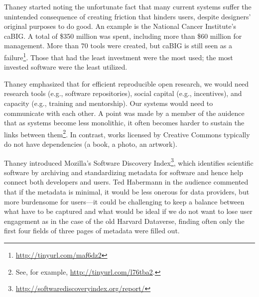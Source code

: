 \documentclass[11pt, oneside]{amsart}
\begin{document}
Thaney started noting the unfortunate fact that many current systems suffer the
unintended consequence of creating friction that hinders users, despite
designers' original purposes to do good. An example is the National Cancer
Institute's caBIG. A total of \$350 million was spent, including more than \$60
million for management. More than $70$ tools were created, but caBIG is still
seen as a failure\footnote{\url{http://tinyurl.com/maf6dz2}}. Those that had the
least investment were the most used; the most invested software were the least
utilized.
\begin{comment}
(Kaitlin didn't really say why? Were the tools used? Did they immediately
bit-rot? Was their development unsustained?)-should ask question about this. Is
there a caBIG report available? Quotes from Andrea Califano/Joe Gray, looks like
there is: \url{tinyurl.com/qdodbo7}.

What do we mean by open research? In regard to community/technology/practices

Inefficiency cartoon:  \url{http://www.xkcd.com/1445/}. 
\end{comment}

Thaney emphasized that for efficient reproducible open research, we would need
research tools (e.g., software repositories), social capital (e.g., incentives),
and capacity (e.g., training and mentorship). Our systems would need to
communicate with each other. A point was made by a member of the auidence that
as systems become less monolithic, it often becomes harder to sustain the links between
them\footnote{See, for example, \url{http://tinyurl.com/l76tba2}.}.
In contrast, works licensed by Creative Commons typically do not 
have dependencies (a book, a photo, an artwork).

Thaney introduced Mozilla's Software Discovery
Index\footnote{\url{http://softwarediscoveryindex.org/report/}}, which
identifies scientific software by archiving and standardizing metadata for
software and hence help connect both developers and users. Ted Habermann in the
audience commented that if the metadata is minimal, it would be less onerous for
data providers, but more burdensome for users---it could be challenging to keep
a balance between what have to be captured and what would be ideal if we do not
want to lose user engagement as in the case of the old Harvard Dataverse, finding often
only the first four fields of three pages of metadata were filled out.
 
\end{document}
